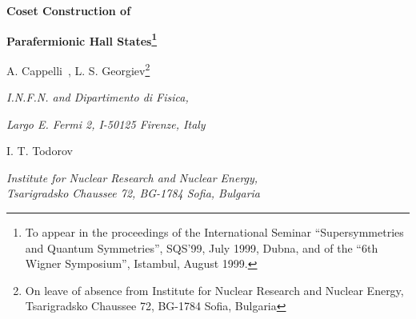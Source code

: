 \documentclass[a4paper,12pt]{article}
\def \Z {{\mathbb Z}}
\begin{document}

\begin{titlepage}
\begin{center}
{\LARGE\bf Coset Construction of}

\vspace{.4cm}

{\LARGE\bf Parafermionic Hall States\footnote{
To appear in the proceedings of the 
International Seminar ``Supersymmetries and Quantum
Symmetries'', SQS'99, July 1999, Dubna, and of
the ``6th Wigner Symposium'', Istambul, August 1999.}
}

\vspace{.6cm}

A. Cappelli\ ,
\qquad L. S. Georgiev\footnote{
On leave of absence from Institute for Nuclear
Research and Nuclear Energy, Tsarigradsko Chaussee 72,
BG-1784 Sofia, Bulgaria}

\vspace{.1cm}

\normalsize\textit{ I.N.F.N. and Dipartimento di Fisica,}

\normalsize\textit{ Largo E. Fermi 2, I-50125 Firenze, Italy}

\vspace{.3cm}

I. T. Todorov

\vspace{.1cm}

\normalsize\textit{ Institute for Nuclear Research and Nuclear Energy,}
\\
\normalsize\textit{ Tsarigradsko Chaussee 72, BG-1784 Sofia, Bulgaria}
\end{center}

\vspace{.8cm}



\begin{abstract}
Fractional quantum Hall fluids with fillings $2 < \nu <3$
have been recently proposed which 
generalize the Pfaffian state ($\nu=2+1/2$) into a hierarchy of
states with parafermionic excitations. 
We describe here the corresponding  $\Z_k$-parafermion conformal 
field theory by means of the coset construction 
$\widehat{su(k)_1}\oplus\widehat{su(k)_1}/\widehat{su(k)_2}$.
This extends our earlier derivation of the Pfaffian state
from a ``parent'' state with abelian affine symmetry plus a 
projection of degrees of freedom.
The numerator of the coset
is actually a rational conformal field theory made out of
$(2k-2)$ scalar fields and a specific extended symmetry.
The coset construction projects out some neutral Hall edge excitations 
while preserving the filling fraction; it also respects the $\Z_k$ parity rule 
coupling neutral and charged excitations in the parent abelian theory.
\end{abstract}

\end{titlepage}
\end{document}
